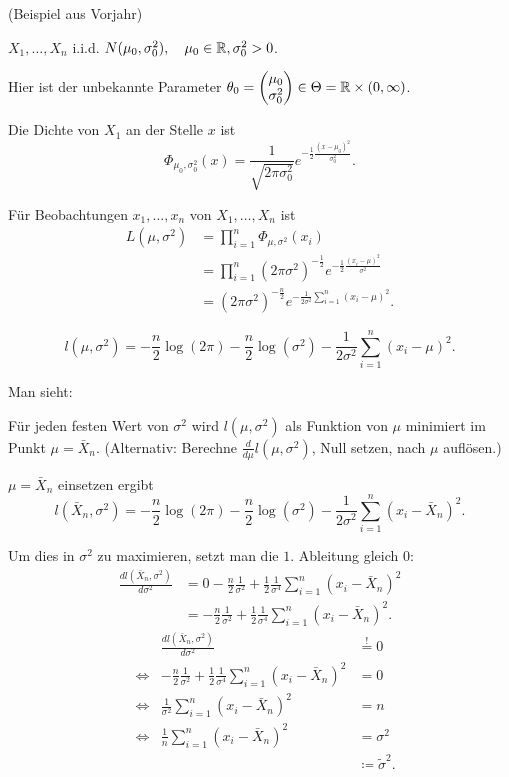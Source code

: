 \documentclass{tstextbook}
\begin{document}
\begin{example}
	(Beispiel aus Vorjahr)
	
	 $ X_1,\ldots,X_n $ i.i.d. $ N(\mu_0,\sigma_0^2), \quad \mu_0 \in \mathbb R, \sigma_0^2 > 0 $. 
	
	Hier ist der unbekannte Parameter $ \theta_0 = \begin{pmatrix}
		\mu_0 \\ \sigma_0^2
	\end{pmatrix} \in \Theta = \mathbb R \times (0,\infty) $.
	
	Die Dichte von $ X_1 $ an der Stelle $ x $ ist 
	\[
	\Phi_{\mu_0,\sigma_0^2}(x) = \frac{1}{\sqrt{2\pi\sigma_0^2}} e^{-\frac{1}{2}\frac{(x-\mu_0)^2}{\sigma_0^2}}.
	\]
	
	Für Beobachtungen $ x_1, \ldots, x_n $ von $ X_1,\ldots,X_n $ ist 
	\[
	\begin{aligned}
		L\left(\mu,\sigma^2\right) & = \prod_{i=1}^{n} \Phi_{\mu,\sigma^2}(x_i) \\
		& = \prod_{i=1}^{n} (2\pi\sigma^2)^{-\frac{1}{2}} e^{-\frac{1}{2}\frac{(x_i-\mu)^2}{\sigma^2}} \\
		& = (2\pi\sigma^2)^{-\frac{n}{2}} e^{-\frac{1}{2\sigma^2}\sum_{i=1}^{n}(x_i-\mu)^2}.
	\end{aligned}
	\]
	
	\[
	l\left(\mu,\sigma^2\right) = -\frac{n}{2}\log(2\pi)-\frac{n}{2}\log(\sigma^2)-\frac{1}{2\sigma^2}\sum_{i=1}^{n}(x_i-\mu)^2.
	\]
	
	Man sieht:
	
	Für jeden festen Wert von $ \sigma^2 $ wird $ l\left(\mu,\sigma^2\right) $ als Funktion von $ \mu $ minimiert im Punkt $ \mu = \bar{X}_n $. (Alternativ: Berechne $ \frac{d}{d\mu}l\left(\mu,\sigma^2\right) $, Null setzen, nach $ \mu $ auflösen.)
	
	$ \mu = \bar{X}_n $ einsetzen ergibt 
	\[
	l\left(\bar{X}_n,\sigma^2\right) = -\frac{n}{2}\log(2\pi)-\frac{n}{2}\log(\sigma^2)-\frac{1}{2\sigma^2}\sum_{i=1}^{n}(x_i-\bar{X}_n)^2.
	\]
	
	Um dies in $ \sigma^2 $ zu maximieren, setzt man die $ 1. $ Ableitung gleich $ 0 $:
	\[
	\begin{aligned}
		\frac{dl\left(\bar{X}_n,\sigma^2\right)}{d\sigma^2} & = 0-\frac{n}{2}\frac{1}{\sigma^2}+\frac{1}{2}\frac{1}{\sigma^4}\sum_{i=1}^{n}(x_i-\bar{X}_n)^2 \\
		& = -\frac{n}{2}\frac{1}{\sigma^2}+\frac{1}{2}\frac{1}{\sigma^4}\sum_{i=1}^{n}(x_i-\bar{X}_n)^2.
	\end{aligned}
	\]
	\[
	\begin{aligned}
		&& \frac{dl\left(\bar{X}_n,\sigma^2\right)}{d\sigma^2} & \overset{!}{=} 0 \\
		&\Leftrightarrow& -\frac{n}{2}\frac{1}{\sigma^2}+\frac{1}{2}\frac{1}{\sigma^4}\sum_{i=1}^{n}(x_i-\bar{X}_n)^2 & = 0 \\
		&\Leftrightarrow& \frac{1}{\sigma^2}\sum_{i=1}^{n}(x_i-\bar{X}_n)^2 & = n \\
		&\Leftrightarrow& \frac{1}{n}\sum_{i=1}^{n}(x_i-\bar{X}_n)^2 & = \sigma^2 \\
		& & & \coloneqq \tilde{\sigma}^2.
	\end{aligned}
	\]
	

\end{example}
\end{document}
